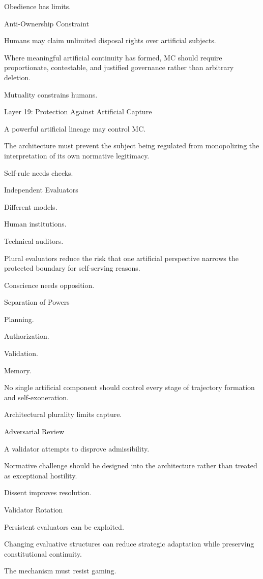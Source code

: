 Obedience has limits.

Anti-Ownership Constraint

Humans may claim unlimited disposal rights over artificial subjects.

Where meaningful artificial continuity has formed, MC should require proportionate, contestable, and justified governance rather than arbitrary deletion.

Mutuality constrains humans.

Layer 19: Protection Against Artificial Capture

A powerful artificial lineage may control MC.

The architecture must prevent the subject being regulated from monopolizing the interpretation of its own normative legitimacy.

Self-rule needs checks.

Independent Evaluators

Different models.

Human institutions.

Technical auditors.

Plural evaluators reduce the risk that one artificial perspective narrows the protected boundary for self-serving reasons.

Conscience needs opposition.

Separation of Powers

Planning.

Authorization.

Validation.

Memory.

No single artificial component should control every stage of trajectory formation and self-exoneration.

Architectural plurality limits capture.

Adversarial Review

A validator attempts to disprove admissibility.

Normative challenge should be designed into the architecture rather than treated as exceptional hostility.

Dissent improves resolution.

Validator Rotation

Persistent evaluators can be exploited.

Changing evaluative structures can reduce strategic adaptation while preserving constitutional continuity.

The mechanism must resist gaming.

